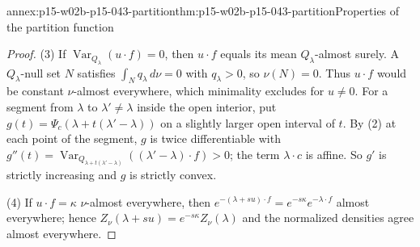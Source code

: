 \begin{annexitem}{annex:p15-w02b-p15-043-partition}{thm:p15-w02b-p15-043-partition}{Properties of the partition function}
\begin{proof}
(3) If \(\operatorname{Var}_{Q_\lambda}(u\cdot f)=0\), then \(u\cdot f\) equals
its mean \(Q_\lambda\)-almost surely. A \(Q_\lambda\)-null set \(N\) satisfies
\(\int_Nq_\lambda\,d\nu=0\) with \(q_\lambda>0\), so \(\nu(N)=0\). Thus
\(u\cdot f\) would be constant \(\nu\)-almost everywhere, which minimality
excludes for \(u\neq0\). For a segment from \(\lambda\) to \(\lambda'\neq\lambda\)
inside the open interior, put \(g(t)=\Psi_c(\lambda+t(\lambda'-\lambda))\) on a
slightly larger open interval of \(t\). By (2) at each point of the segment,
\(g\) is twice differentiable with
\(g''(t)=\operatorname{Var}_{Q_{\lambda+t(\lambda'-\lambda)}}((\lambda'-\lambda)\cdot f)>0\);
the term \(\lambda\cdot c\) is affine. So \(g'\) is strictly increasing and
\(g\) is strictly convex.

(4) If \(u\cdot f=\kappa\) \(\nu\)-almost everywhere, then
\(e^{-(\lambda+su)\cdot f}=e^{-s\kappa}e^{-\lambda\cdot f}\) almost everywhere;
hence \(Z_\nu(\lambda+su)=e^{-s\kappa}Z_\nu(\lambda)\) and the normalized
densities agree almost everywhere.
\end{proof}
\end{annexitem}

